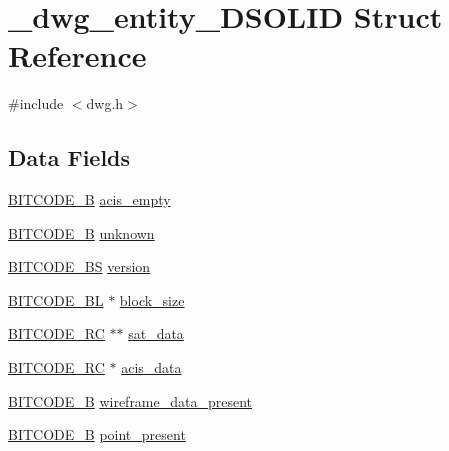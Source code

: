 \hypertarget{struct__dwg__entity__3DSOLID}{\section{\-\_\-dwg\-\_\-entity\-\_\-D\-S\-O\-L\-I\-D \-Struct \-Reference}
\label{struct__dwg__entity__3DSOLID}
}


{\ttfamily \#include $<$dwg.\-h$>$}

\subsection*{\-Data \-Fields}
\begin{DoxyCompactItemize}
\item 
\hyperlink{dwg_8h_ab533b1f62d9086749e3bb5b67e9f224e}{\-B\-I\-T\-C\-O\-D\-E\-\_\-\-B} \hyperlink{struct__dwg__entity__3DSOLID_afc63e62bc1816f9294767d97eb06113f}{acis\-\_\-empty}
\item 
\hyperlink{dwg_8h_ab533b1f62d9086749e3bb5b67e9f224e}{\-B\-I\-T\-C\-O\-D\-E\-\_\-\-B} \hyperlink{struct__dwg__entity__3DSOLID_a21ba4c459bdc9056451ff417c418514f}{unknown}
\item 
\hyperlink{dwg_8h_a94297606fbd4a4ff97e8add284af0809}{\-B\-I\-T\-C\-O\-D\-E\-\_\-\-B\-S} \hyperlink{struct__dwg__entity__3DSOLID_af85af845fa79831f631910ed9e9e0cba}{version}
\item 
\hyperlink{dwg_8h_aebd5f127038868cbabc3d55d91da776c}{\-B\-I\-T\-C\-O\-D\-E\-\_\-\-B\-L} $\ast$ \hyperlink{struct__dwg__entity__3DSOLID_a46a786b58b8e3d647680239d14f31b6f}{block\-\_\-size}
\item 
\hyperlink{dwg_8h_a7fd199a8f9c9cc52bdab220f65a2a619}{\-B\-I\-T\-C\-O\-D\-E\-\_\-\-R\-C} $\ast$$\ast$ \hyperlink{struct__dwg__entity__3DSOLID_ac13c251782a35ee60c62ec93924e916e}{sat\-\_\-data}
\item 
\hyperlink{dwg_8h_a7fd199a8f9c9cc52bdab220f65a2a619}{\-B\-I\-T\-C\-O\-D\-E\-\_\-\-R\-C} $\ast$ \hyperlink{struct__dwg__entity__3DSOLID_ac37d9c35e6a9bdbeca6091819341d000}{acis\-\_\-data}
\item 
\hyperlink{dwg_8h_ab533b1f62d9086749e3bb5b67e9f224e}{\-B\-I\-T\-C\-O\-D\-E\-\_\-\-B} \hyperlink{struct__dwg__entity__3DSOLID_a22de80000733f29f785ad980da1b0070}{wireframe\-\_\-data\-\_\-present}
\item 
\hyperlink{dwg_8h_ab533b1f62d9086749e3bb5b67e9f224e}{\-B\-I\-T\-C\-O\-D\-E\-\_\-\-B} \hyperlink{struct__dwg__entity__3DSOLID_ae5a557fc722e6ad28f1eddc80d007066}{point\-\_\-present}
$$
\end{DoxyCompactItemize}

